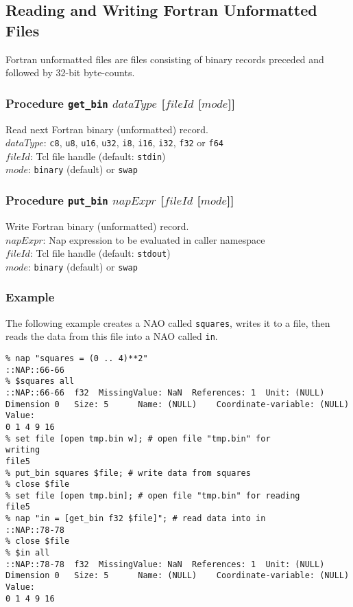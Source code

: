 \subsection{Reading and Writing Fortran Unformatted Files}
    \label{bin-io-Fortran-Unformatted-Files}

  Fortran unformatted files are files consisting of binary records
  preceded and followed by 32-bit byte-counts.

\subsubsection{Procedure
\texttt{get\_bin} $\mathit{dataType}$ [$\mathit{fileId}$ [$\mathit{mode}$]]}
    \label{bin-io-get-bin}

  Read next Fortran binary (unformatted) record.
  \\
  $\mathit{dataType}$: 
  \texttt{c8}, 
  \texttt{u8}, 
  \texttt{u16}, 
  \texttt{u32}, 
  \texttt{i8}, 
  \texttt{i16}, 
  \texttt{i32}, 
  \texttt{f32} or 
  \texttt{f64}
  \\
  $\mathit{fileId}$: Tcl file handle (default: 
  \texttt{stdin})
  \\
  $\mathit{mode}$: 
  \texttt{binary} (default) or 
  \texttt{swap}

\subsubsection{Procedure \texttt{put\_bin} $napExpr$ [$\mathit{fileId}$ [$\mathit{mode}$]]}
    \label{bin-io-put-bin}

  Write Fortran binary (unformatted) record.
  \\
  $napExpr$: Nap expression to be evaluated in caller
  namespace
  \\
  $\mathit{fileId}$: Tcl file handle (default: 
  \texttt{stdout})
  \\
  $\mathit{mode}$: 
  \texttt{binary} (default) or 
  \texttt{swap}

\subsubsection{Example}
    \label{bin-io-Example}

  The following example creates a NAO called 
  \texttt{squares}, writes it to a file, then reads the data from
  this file into a NAO called 
  \texttt{in}.
  \begin{verbatim}
% nap "squares = (0 .. 4)**2"
::NAP::66-66
% $squares all
::NAP::66-66  f32  MissingValue: NaN  References: 1  Unit: (NULL)
Dimension 0   Size: 5      Name: (NULL)    Coordinate-variable: (NULL)
Value:
0 1 4 9 16
% set file [open tmp.bin w]; # open file "tmp.bin" for
writing
file5
% put_bin squares $file; # write data from squares
% close $file
% set file [open tmp.bin]; # open file "tmp.bin" for reading
file5
% nap "in = [get_bin f32 $file]"; # read data into in
::NAP::78-78
% close $file
% $in all
::NAP::78-78  f32  MissingValue: NaN  References: 1  Unit: (NULL)
Dimension 0   Size: 5      Name: (NULL)    Coordinate-variable: (NULL)
Value:
0 1 4 9 16
\end{verbatim}


